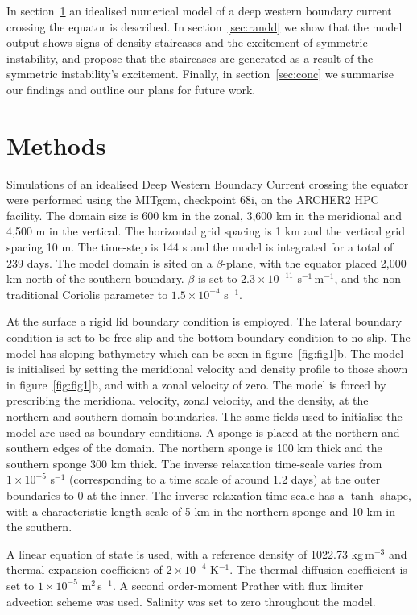 In section~\ref{sec:methods} an idealised numerical model of a deep western boundary current crossing the equator is described. In section~\ref{sec:randd} we show that the model output shows signs of density staircases and the excitement of symmetric instability, and propose that the staircases are generated as a result of the symmetric instability's excitement. Finally, in section~\ref{sec:conc} we summarise our findings and outline our plans for future work.

\section{Methods}
\label{sec:methods}
Simulations of an idealised Deep Western Boundary Current crossing the equator were performed using the MITgcm, checkpoint 68i, on the ARCHER2 HPC facility. The domain size is 600 km in the zonal, 3,600 km in the meridional and 4,500 m in the vertical. The horizontal grid spacing is 1 km and the vertical grid spacing 10 m. The time-step is 144 s and the model is integrated for a total of 239 days. The model domain is sited on a $\beta$-plane, with the equator placed 2,000 km north of the southern boundary. $\beta$ is set to $2.3 \times 10^{-11}$ s$^{-1}\,$m$^{-1}$, and the non-traditional Coriolis parameter to $1.5 \times 10^{-4}$ s$^{-1}$.

At the surface a rigid lid boundary condition is employed. The lateral boundary condition is set to be free-slip and the bottom boundary condition to no-slip. The model has sloping bathymetry which can be seen in figure~\ref{fig:fig1}b. The model is initialised by setting the meridional velocity and density profile to those shown in figure~\ref{fig:fig1}b, and with a zonal velocity of zero. The model is forced by prescribing the meridional velocity, zonal velocity, and the density, at the northern and southern domain boundaries. The same fields used to initialise the model are used as boundary conditions. A sponge is placed at the northern and southern edges of the domain. The northern sponge is 100 km thick and the southern sponge 300 km thick. The inverse relaxation time-scale varies from $1\times 10^{-5}$ s$^{-1}$ (corresponding to a time scale of around 1.2 days) at the outer boundaries to 0 at the inner. The inverse relaxation time-scale has a $\tanh$ shape, with a characteristic length-scale of 5 km in the northern sponge and 10 km in the southern.

A linear equation of state is used, with a reference density of 1022.73 kg\,m$^{-3}$ and thermal expansion coefficient of $2 \times 10^{-4}$ K$^{-1}$. The thermal diffusion coefficient is set to $1 \times 10^{-5}$ m$^{2}$\,s$^{-1}$. A second order-moment Prather with flux limiter advection scheme was used. Salinity was set to zero throughout the model.

